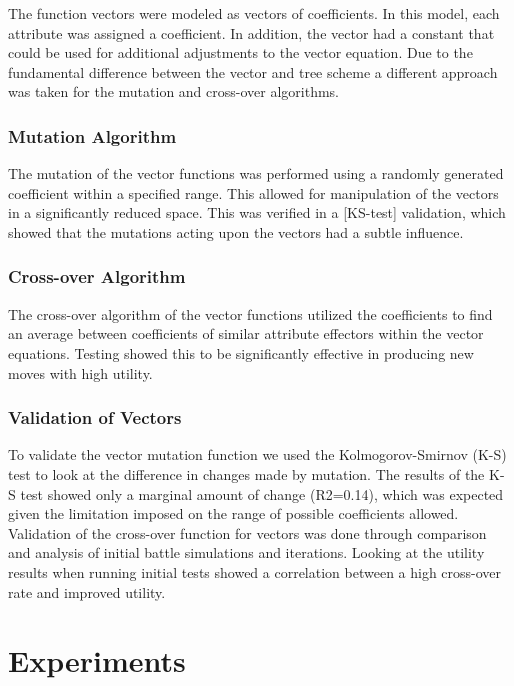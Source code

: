 \documentclass{acm_proc_article-sp}
\begin{document}
The function vectors were modeled as vectors of coefficients. In this model, each attribute was assigned a coefficient. In addition, the vector had a constant that could be used for additional adjustments to the vector equation. Due to the fundamental difference between the vector and tree scheme a different approach was taken for the mutation and cross-over algorithms. 
    
    \subsubsection{Mutation Algorithm}
    The mutation of the vector functions was performed using a randomly generated coefficient within a specified range. This allowed for manipulation of the vectors in a significantly reduced space. This was verified in a [KS-test] validation, which showed that the mutations acting upon the vectors had a subtle influence.
    
    \subsubsection{Cross-over Algorithm}
    The cross-over algorithm of the vector functions utilized the coefficients to find an average between coefficients of similar attribute effectors within the vector equations. Testing showed this to be significantly effective in producing new moves with high utility.
    
    \subsubsection{Validation of Vectors}
    To validate the vector mutation function we used the Kolmogorov-Smirnov (K-S)  test to look at the difference in changes made by mutation. The results of the K-S test showed only a marginal amount of change (R2=0.14), which was expected given the limitation imposed on the range of possible coefficients allowed.
    Validation of the cross-over function for vectors was done through comparison and analysis of initial battle simulations and iterations. Looking at the utility results when running initial tests showed a correlation between a high cross-over rate and improved utility.
    
    
    \section{Experiments}
\end{document}
